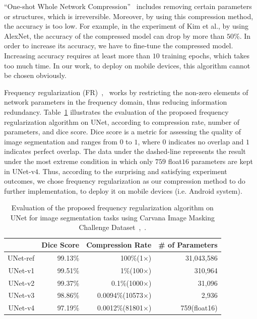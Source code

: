 \documentclass[runningheads]{llncs}
\begin{document}
``One-shot Whole Network Compression''~\cite{kim2016oneshot} includes removing certain parameters or structures, which is irreversible. Moreover, by using this compression method, the accuracy is too low. For example, in the experiment of Kim et al., by using AlexNet, the accuracy of the compressed model can drop by more than $50\%$. In order to increase its accuracy, we have to fine-tune the compressed model. Increasing accuracy requires at least more than $10$ training epochs, which takes too much time. In our work, to deploy on mobile devices, this algorithm cannot be chosen obviously. 


Frequency regularization (FR)~\cite{zhao2023fr},~\cite{fr_repo} works by restricting the non-zero elements of network parameters in the frequency domain, thus reducing information redundancy. Table~\ref{table:fr_unet} illustrates the evaluation of the proposed frequency regularization algorithm on UNet, according to compression rate, number of parameters, and dice score. Dice score is a metric for assessing the quality of image segmentation and ranges from $0$ to $1$, where $0$ indicates no overlap and $1$ indicates perfect overlap. The data under the dashed-line represents the result under the most extreme condition in which only $759$ float$16$ parameters are kept in UNet-v$4$. Thus, according to the surprising and satisfying experiment outcomes, we chose frequency regularization as our compression method to do further implementation, to deploy it on mobile devices (i.e. Android system).

\begin{table}[H]
	\caption{Evaluation of the proposed frequency regularization algorithm on UNet for image segmentation tasks using Carvana Image Masking Challenge Dataset~\cite{zhao2023fr},~\cite{brian2017carvanadataset}.} 
	\label{table:fr_unet}
	\small
	\centering
	\begin{tabular}{rrrr}
		\toprule
		&Dice Score&Compression Rate&\# of Parameters\\ 
		\midrule\midrule
		UNet-ref&99.13\%&100\%(1×)&31,043,586\\
		UNet-v1&99.51\%&1\%(100×)&310,964\\
		UNet-v2&99.37\%&0.1\%(1000×)&31,096\\
		UNet-v3&98.86\%&0.0094\%(10573×)&2,936\\
		\cdashline{1-4}
		UNet-v4&97.19\%&0.0012\%(81801×)&759(float16)\\
		\bottomrule
	\end{tabular}
\end{table}
\end{document}

